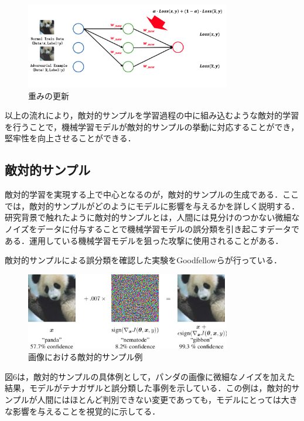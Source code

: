 \begin{enumerate}
    \begin{figure}[H]
        \centering
        \includegraphics[width=0.8\textwidth]{images/敵対的学習4.png}
        \caption{重みの更新}
        \label{fig:adversarial_learning4}
    \end{figure}

\end{enumerate}

以上の流れにより，敵対的サンプルを学習過程の中に組み込むような敵対的学習を行うことで，機械学習モデルが敵対的サンプルの挙動に対応することができ，堅牢性を向上させることができる．

\subsection{敵対的サンプル}
敵対的学習を実現する上で中心となるのが，敵対的サンプルの生成である．ここでは，敵対的サンプルがどのようにモデルに影響を与えるかを詳しく説明する．
研究背景で触れたように敵対的サンプルとは，人間には見分けのつかない微細なノイズをデータに付与することで機械学習モデルの誤分類を引き起こすデータである．\cite{MBSD-AdversarialExample}運用している機械学習モデルを狙った攻撃に使用されることがある．

敵対的サンプルによる誤分類を確認した実験をGoodfellowらが行っている\cite{goodfellow2015explaining}．
\begin{figure}[H]
    \centering
    \includegraphics[width=0.8\textwidth]{images/goodfellow_panda.png}
    \caption{画像における敵対的サンプル例\cite{goodfellow2015explaining}}
    \label{fig:adversarial_example}
\end{figure}

図6は，敵対的サンプルの具体例として，パンダの画像に微細なノイズを加えた結果，モデルがテナガザルと誤分類した事例を示している．この例は，敵対的サンプルが人間にはほとんど判別できない変更であっても，モデルにとっては大きな影響を与えることを視覚的に示してる．

